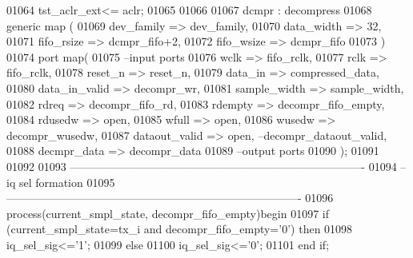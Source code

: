 \begin{DoxyCode}
01064 \textcolor{vhdlchar}{tst_aclr_ext}\textcolor{vhdlchar}{<=} \textcolor{vhdlchar}{aclr};
01065 
01066 
01067 dcmpr :  decompress 
01068   \textcolor{keywordflow}{generic} \textcolor{keywordflow}{map}  (
01069                     dev_family => dev_family,
01070                     data_width => \textcolor{vhdllogic}{32},
01071                fifo_rsize => dcmpr\_fifo+2,
01072                     fifo_wsize => dcmpr_fifo
01073                     \textcolor{vhdlchar}{)}
01074   \textcolor{keywordflow}{port} \textcolor{keywordflow}{map}(
01075 \textcolor{keyword}{        --input ports }
01076         wclk          => fifo_rclk,  
01077         rclk          => fifo_rclk, 
01078         reset_n       => reset_n, 
01079         data_in       => compressed_data, 
01080         data_in_valid => decompr_wr, 
01081         sample_width  => sample_width,
01082         rdreq         => decompr_fifo_rd,
01083         rdempty       => decompr_fifo_empty,
01084         rdusedw       => \textcolor{keywordflow}{open}, 
01085         wfull         => \textcolor{keywordflow}{open}, 
01086         wusedw        => decompr_wusedw,
01087         dataout_valid => \textcolor{keywordflow}{open},\textcolor{keyword}{ --decompr\_dataout\_valid,  }
01088         decmpr_data   => decompr_data
01089 \textcolor{keyword}{        --output ports       }
01090         \textcolor{vhdlchar}{)};
01091  
01092  
01093 \textcolor{keyword}{-------------------------------------------------------------------------------}
01094 \textcolor{keyword}{--iq sel formation}
01095 \textcolor{keyword}{-------------------------------------------------------------------------------        }
01096 \textcolor{keywordflow}{process}(current_smpl_state, decompr_fifo_empty)\textcolor{keywordflow}{begin}
01097     \textcolor{keywordflow}{if} \textcolor{vhdlchar}{(}\textcolor{vhdlchar}{current_smpl_state}\textcolor{vhdlchar}{=}\textcolor{vhdlchar}{tx\_i} \textcolor{keywordflow}{and} \textcolor{vhdlchar}{decompr_fifo_empty}\textcolor{vhdlchar}{=}\textcolor{vhdlchar}{'}\textcolor{vhdllogic}{}\textcolor{vhdllogic}{0}\textcolor{vhdlchar}{'}\textcolor{vhdlchar}{)} \textcolor{keywordflow}{then}
01098             \textcolor{vhdlchar}{iq_sel_sig}\textcolor{vhdlchar}{<=}\textcolor{vhdlchar}{'}\textcolor{vhdllogic}{}\textcolor{vhdllogic}{1}\textcolor{vhdlchar}{'}; 
01099     \textcolor{keywordflow}{else}
01100           \textcolor{vhdlchar}{iq_sel_sig}\textcolor{vhdlchar}{<=}\textcolor{vhdlchar}{'}\textcolor{vhdllogic}{}\textcolor{vhdllogic}{0}\textcolor{vhdlchar}{'};
01101     \textcolor{keywordflow}{end} \textcolor{keywordflow}{if}; 

\end{DoxyCode}
